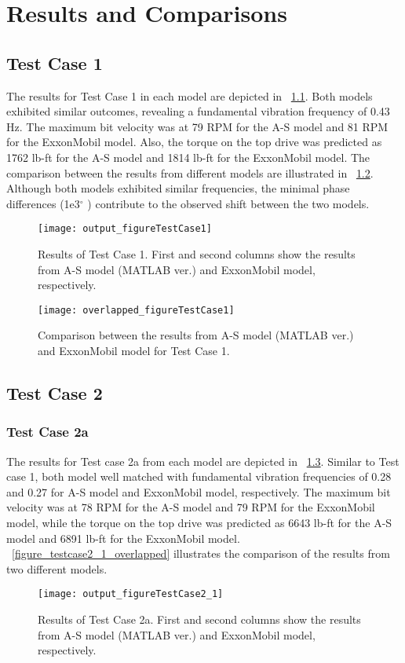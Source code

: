 \chapter{Results and Comparisons} 
\label{ch:results} 
\section{Test Case 1}
The results for Test Case 1 in each model are depicted in \figurename~\ref{figure_testcase1}. Both models exhibited similar outcomes, revealing a fundamental vibration frequency of 0.43 Hz. The maximum bit velocity was at 79 RPM for the A-S model and 81 RPM for the ExxonMobil model. Also, the torque on the top drive was predicted as 1762 lb-ft for the A-S model and 1814 lb-ft for the ExxonMobil model. The comparison between the results from different models are illustrated in \figurename~\ref{figure_testcase1_overlapped}. Although both models exhibited similar frequencies, the minimal phase differences (1e3$^{\circ}$ ) contribute to the observed shift between the two models.
\begin{figure}
  \centering
  \texttt{[image: output\_figureTestCase1]}
  \caption[Results of Test Case 1]{Results of Test Case 1. First and second columns show the results from A-S model (MATLAB ver.) and ExxonMobil model, respectively.}\label{figure_testcase1}
\end{figure}

\begin{figure}
  \centering
  \texttt{[image: overlapped\_figureTestCase1]}
  \caption[Comparison of the results for Test Case 1]{Comparison between the results from A-S model (MATLAB ver.) and ExxonMobil model for Test Case 1.}\label{figure_testcase1_overlapped}
\end{figure}

\section{Test Case 2}
\subsection{Test Case 2a}
The results for Test case 2a from each model are depicted in \figurename~\ref{figure_testcase2_1}. Similar to Test case 1, both model well matched with fundamental vibration frequencies of 0.28 and 0.27 for A-S model and ExxonMobil model, respectively. The maximum bit velocity was at 78 RPM for the A-S model and 79 RPM for the ExxonMobil model, while the torque on the top drive was predicted as 6643 lb-ft for the A-S model and 6891 lb-ft for the ExxonMobil model. \figurename~\ref{figure_testcase2_1_overlapped} illustrates the comparison of the results from two different models. 
\begin{figure}
  \centering
  \texttt{[image: output\_figureTestCase2\_1]}
  \caption[Results of Test Case 2a]{Results of Test Case 2a. First and second columns show the results from A-S model (MATLAB ver.) and ExxonMobil model, respectively.}\label{figure_testcase2_1}
\end{figure}

